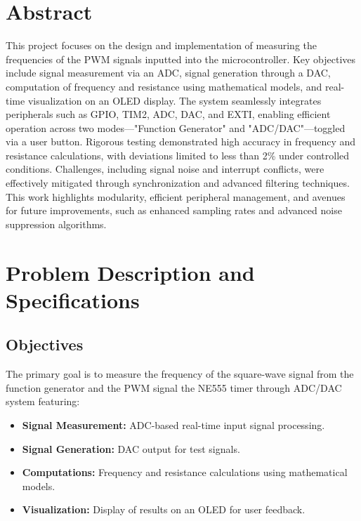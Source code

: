 \documentclass[12pt]{article}
\begin{document}


\tableofcontents
\newpage

\section*{Abstract}
This project focuses on the design and implementation of measuring the frequencies of the PWM signals inputted into the microcontroller. Key objectives include signal measurement via an ADC, signal generation through a DAC, computation of frequency and resistance using mathematical models, and real-time visualization on an OLED display. The system seamlessly integrates peripherals such as GPIO, TIM2, ADC, DAC, and EXTI, enabling efficient operation across two modes—"Function Generator" and "ADC/DAC"—toggled via a user button. Rigorous testing demonstrated high accuracy in frequency and resistance calculations, with deviations limited to less than 2\% under controlled conditions. Challenges, including signal noise and interrupt conflicts, were effectively mitigated through synchronization and advanced filtering techniques. This work highlights modularity, efficient peripheral management, and avenues for future improvements, such as enhanced sampling rates and advanced noise suppression algorithms.

\section{Problem Description and Specifications}
\subsection{Objectives}
The primary goal is to measure the frequency of the square-wave signal from the function generator and the PWM signal the NE555 timer through ADC/DAC system featuring:
\begin{itemize}[leftmargin=2em]
    \item \textbf{Signal Measurement:} ADC-based real-time input signal processing.
    \item \textbf{Signal Generation:} DAC output for test signals.
    \item \textbf{Computations:} Frequency and resistance calculations using mathematical models.
    \item \textbf{Visualization:} Display of results on an OLED for user feedback.
\end{itemize}
\end{document}
